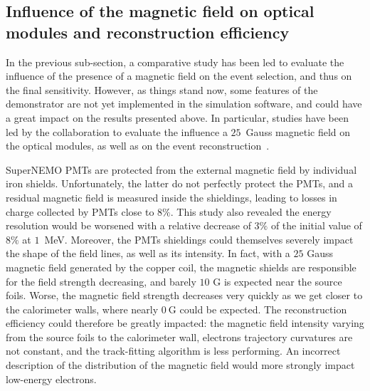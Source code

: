 
\subsection{Influence of the magnetic field on optical modules and reconstruction efficiency}

In the previous sub-section, a comparative study has been led to evaluate the influence of the presence of a magnetic field on the event selection, and thus on the final sensitivity.
However, as things stand now, some features of the demonstrator are not yet implemented in the simulation software, and could have a great impact on the results presented above.
In particular, studies have been led by the collaboration to evaluate the influence a $25$~Gauss magnetic field on the optical modules, as well as on the event reconstruction~\cite{CalvezThesis}\cite{internal:magnetic_field}.

SuperNEMO PMTs are protected from the external magnetic field by individual iron shields.
Unfortunately, the latter do not perfectly protect the PMTs, and a residual magnetic field is measured inside the shieldings, leading to losses in charge collected by PMTs close to $8\%$.
This study also revealed the energy resolution would be worsened with a relative decrease of $3\%$ of the initial value of $8\%$ at $1$~MeV.
Moreover, the PMTs shieldings could themselves severely impact the shape of the field lines, as well as its intensity.
In fact, with a $25$ Gauss magnetic field generated by the copper coil, the magnetic shields are responsible for the field strength decreasing, and barely $10$ G is expected near the source foils.
Worse, the magnetic field strength decreases very quickly as we get closer to the calorimeter walls, where nearly $0~$G could be expected.
The reconstruction efficiency could therefore be greatly impacted:
the magnetic field intensity varying from the source foils to the calorimeter wall, electrons trajectory curvatures are not constant, and the track-fitting algorithm is less performing.
An incorrect description of the distribution of the magnetic field would more strongly impact low-energy electrons.

